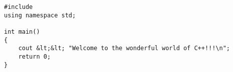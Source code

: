 \begin{lstlisting}[caption={test algorithm}]
#include
using namespace std;
 
int main()
{
	cout &lt;&lt; "Welcome to the wonderful world of C++!!!\n";
	return 0;
}
\end{lstlisting}